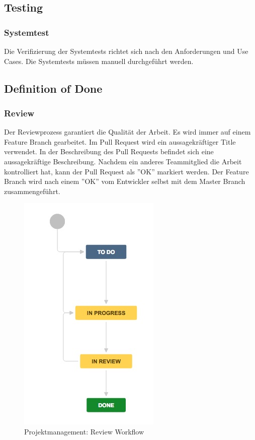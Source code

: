 \subsection{Testing}
\subsubsection{Systemtest}
Die Verifizierung der Systemtests richtet sich nach den Anforderungen und Use Cases. Die Systemtests müssen manuell durchgeführt werden.

\subsection{Definition of Done}

\subsubsection{Review}
Der Reviewprozess garantiert die Qualität der Arbeit. Es wird immer auf einem Feature Branch gearbeitet. Im Pull Request wird ein aussagekräftiger Title verwendet. In der Beschreibung des Pull Requests befindet sich eine aussagekräftige Beschreibung. Nachdem ein anderes Teammitglied die Arbeit kontrolliert hat, kann der Pull Request als ''OK'' markiert werden. Der Feature Branch wird nach einem ''OK'' vom Entwickler selbst mit dem Master Branch zusammengeführt.

\begin{figure}[H]
	\centering
	\includegraphics[scale=0.8]{img/review-workflow.jpg}
	\caption{Projektmanagement: Review Workflow}
	\label{fig:review_workflow}
\end{figure}

